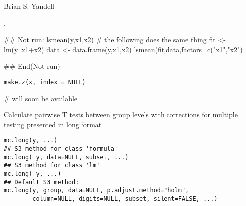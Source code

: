 \documentclass[a4paper]{book}
\begin{document}
%
\begin{Author}\relax
Brian S. Yandell
\end{Author}
%
\begin{SeeAlso}\relax
{}.
\end{SeeAlso}
%
\begin{Examples}
\begin{ExampleCode}
## Not run: 
lsmean(y,x1,x2)
# the following does the same thing
fit <- lm(y~x1+x2)
data <- data.frame(y,x1,x2)
lsmean(fit,data,factors=c("x1","x2")

## End(Not run)
\end{ExampleCode}
\end{Examples}
\newpage
{}
%
\begin{Usage}
\begin{verbatim}
make.z(x, index = NULL)
\end{verbatim}
\end{Usage}
%
\begin{Arguments}
\begin{ldescription}
\item[\code{x}] 


\item[\code{index}] 


\end{ldescription}
\end{Arguments}
%
\begin{Examples}
\begin{ExampleCode}
# will soon be available
\end{ExampleCode}
\end{Examples}
\newpage
{}
%
\begin{Description}\relax
Calculate pairwise T tests between group levels with corrections for multiple testing presented in long format
\end{Description}
%
\begin{Usage}
\begin{verbatim}
mc.long(y, ...)
## S3 method for class 'formula'
mc.long( y, data=NULL, subset, ...)
## S3 method for class 'lm'
mc.long( y, ...)
## Default S3 method:
mc.long(y, group, data=NULL, p.adjust.method="holm",
        column=NULL, digits=NULL, subset, silent=FALSE, ...)
\end{verbatim}
\end{Usage}
%
\end{document}
